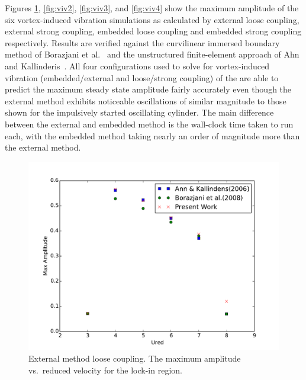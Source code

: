 Figures \ref{fig:viv1}, \ref{fig:viv2}, \ref{fig:viv3}, and \ref{fig:viv4} show the maximum amplitude of the six vortex-induced vibration simulations as calculated by external loose coupling, external strong coupling, embedded loose coupling and embedded strong coupling respectively. 
Results are verified against the curvilinear immersed boundary method of Borazjani et al.~\cite{borazjani2008curvilinear} and the unstructured finite-element approach of Ahn and Kallinderis~\cite{ahn2006strongly}. 
All four configurations used to solve for vortex-induced vibration (embedded/external and loose/strong coupling) of the are able to predict the maximum steady state amplitude fairly accurately even though the external method exhibits noticeable oscillations of similar magnitude to those shown for the impulsively started oscillating cylinder. 
The main difference between the external and embedded method is the wall-clock time taken to run each, with the embedded method taking nearly an order of magnitude more than the external method.
\begin{figure}
	\centering
	\includegraphics[width=\textwidth]{vivexlc}
	\caption{External method loose coupling. The maximum amplitude vs.~reduced velocity for the lock-in region.}
	\label{fig:viv1}
\end{figure}
